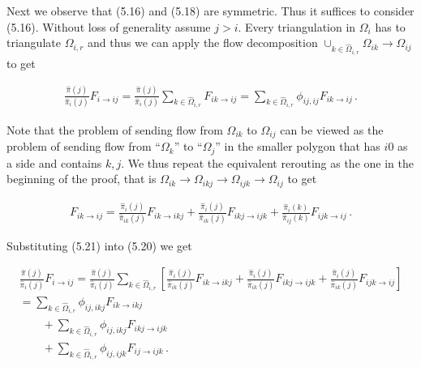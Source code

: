 Next we observe that (5.16) and (5.18) are symmetric. Thus it suffices to consider (5.16). Without loss of generality assume $j>i$. Every triangulation in $\Omega_{i}$ has to triangulate $\Omega_{i,r}$ and thus we can apply the flow decomposition $\cup_{k\in\hat{\Omega}_{i,r}}\Omega_{ik}\rightarrow\Omega_{ij}$ to get\par


\[\begin{gathered}
\frac{\hat{\pi}(j)}{\hat{\pi}_{i}(j)}F_{i\rightarrow ij}=\frac{\hat{\pi}(j)}{\hat{\pi}_{i}(j)}\sum_{k\in\hat{\Omega}_{i,r}}F_{ik\rightarrow ij}=\sum_{k\in\hat{\Omega}_{i,r}}\phi_{ij,ij}F_{ik\rightarrow ij}\,.
\end{gathered}\]




Note that the problem of sending flow from $\Omega_{ik}$ to $\Omega_{ij}$ can be viewed as the problem of sending flow from “$\Omega_{k}$” to “$\Omega_{j}$” in the smaller polygon that has $i0$ as a side and contains $k,j$. We thus repeat the equivalent rerouting as the one in the beginning of the proof, that is $\Omega_{ik}\rightarrow\Omega_{ikj}\rightarrow\Omega_{ijk}\rightarrow\Omega_{ij}$ to get\par




\[\begin{gathered}
\displaystyle F_{ik\rightarrow ij} \displaystyle=\frac{\hat{\pi}_{i}(j)}{\hat{\pi}_{ik}(j)}F_{ik\rightarrow ikj}+\frac{\hat{\pi}_{i}(j)}{\hat{\pi}_{ik}(j)}F_{ikj\rightarrow ijk}+\frac{\hat{\pi}_{i}(k)}{\hat{\pi}_{ij}(k)}F_{ijk\rightarrow ij}\,.
\end{gathered}\]


Substituting (5.21) into (5.20) we get\par


\[\begin{gathered}
\displaystyle\frac{\hat{\pi}(j)}{\hat{\pi}_{i}(j)}F_{i\rightarrow ij} \displaystyle=\frac{\hat{\pi}(j)}{\hat{\pi}_{i}(j)}\sum_{k\in\hat{\Omega}_{i,r}}\left[\frac{\hat{\pi}_{i}(j)}{\hat{\pi}_{ik}(j)}F_{ik\rightarrow ikj}+\frac{\hat{\pi}_{i}(j)}{\hat{\pi}_{ik}(j)}F_{ikj\rightarrow ijk}+\frac{\hat{\pi}_{i}(j)}{\hat{\pi}_{ik}(j)}F_{ijk\rightarrow ij}\right] \\
\displaystyle=\sum_{k\in\hat{\Omega}_{i,r}}\phi_{ij,ikj}F_{ik\rightarrow ikj} \\
\displaystyle\qquad+\sum_{k\in\hat{\Omega}_{i,r}}\phi_{ij,ikj}F_{ikj\rightarrow ijk} \\
\displaystyle\qquad+\sum_{k\in\hat{\Omega}_{i,r}}\phi_{ij,ijk}F_{ij\rightarrow ijk}\,.
\end{gathered}\]





